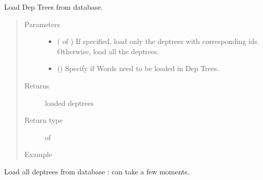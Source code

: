 \documentclass[letterpaper,10pt,english]{sphinxmanual}
\begin{document}

\begin{fulllineitems}
\label{\detokenize{load:loacore.load.deptree_load.load_dep_trees}}
Load Dep Trees from database.
\begin{quote}\begin{description}
\item[{Parameters}] \leavevmode\begin{itemize}
\item {} 
 ( of ) \textendash{} If specified, load only the deptrees with corresponding ids. Otherwise, load all the deptrees.

\item {} 
 () \textendash{} Specify if Words need to be loaded in Dep Trees.

\end{itemize}

\item[{Returns}] \leavevmode
loaded deptrees

\item[{Return type}] \leavevmode
{} of {\hyperref[\detokenize{classes:loacore.classes.classes.DepTree}]{}}

\item[{Example}] \leavevmode
\end{description}\end{quote}

Load all deptrees from database : can take a few moments.


\end{fulllineitems}
\end{document}
